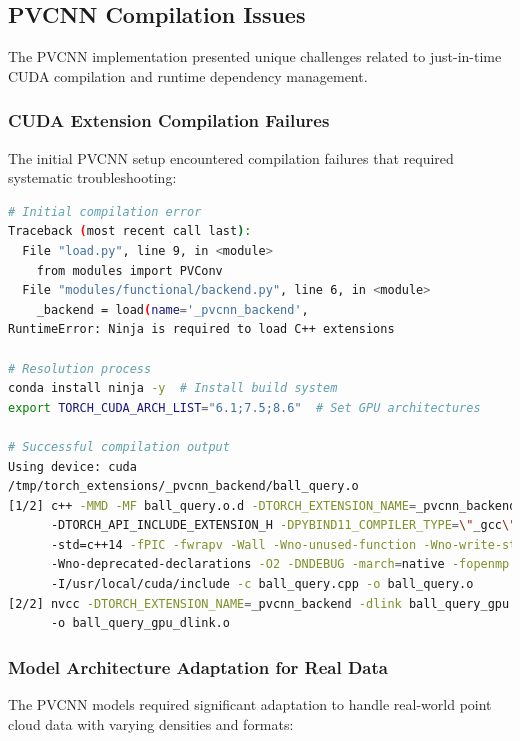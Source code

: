 \documentclass[12pt,a4paper]{report}
\begin{document}
\subsection{PVCNN Compilation Issues}

The PVCNN implementation presented unique challenges related to just-in-time CUDA compilation and runtime dependency management.

\subsubsection{CUDA Extension Compilation Failures}

The initial PVCNN setup encountered compilation failures that required systematic troubleshooting:

\begin{lstlisting}[caption=PVCNN Compilation Error Resolution, label=lst:pvcnn_compilation, language=bash]
# Initial compilation error
Traceback (most recent call last):
  File "load.py", line 9, in <module>
    from modules import PVConv
  File "modules/functional/backend.py", line 6, in <module>
    _backend = load(name='_pvcnn_backend',
RuntimeError: Ninja is required to load C++ extensions

# Resolution process
conda install ninja -y  # Install build system
export TORCH_CUDA_ARCH_LIST="6.1;7.5;8.6"  # Set GPU architectures

# Successful compilation output
Using device: cuda
/tmp/torch_extensions/_pvcnn_backend/ball_query.o
[1/2] c++ -MMD -MF ball_query.o.d -DTORCH_EXTENSION_NAME=_pvcnn_backend 
      -DTORCH_API_INCLUDE_EXTENSION_H -DPYBIND11_COMPILER_TYPE=\"_gcc\" 
      -std=c++14 -fPIC -fwrapv -Wall -Wno-unused-function -Wno-write-strings 
      -Wno-deprecated-declarations -O2 -DNDEBUG -march=native -fopenmp 
      -I/usr/local/cuda/include -c ball_query.cpp -o ball_query.o
[2/2] nvcc -DTORCH_EXTENSION_NAME=_pvcnn_backend -dlink ball_query_gpu.o 
      -o ball_query_gpu_dlink.o
\end{lstlisting}

\subsubsection{Model Architecture Adaptation for Real Data}

The PVCNN models required significant adaptation to handle real-world point cloud data with varying densities and formats:
\end{document}
